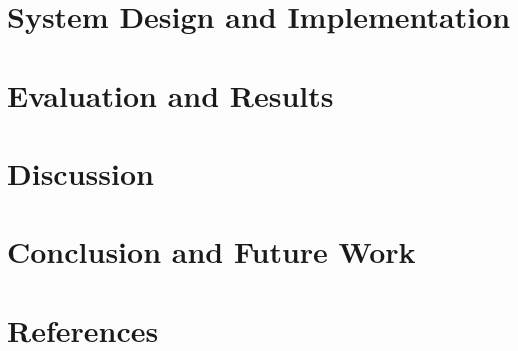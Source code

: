 \documentclass[12pt]{report}
\begin{document}
\chapter{System Design and Implementation}


\chapter{Evaluation and Results}


\chapter{Discussion}


\chapter{Conclusion and Future Work}


\chapter*{References}

\end{document}
